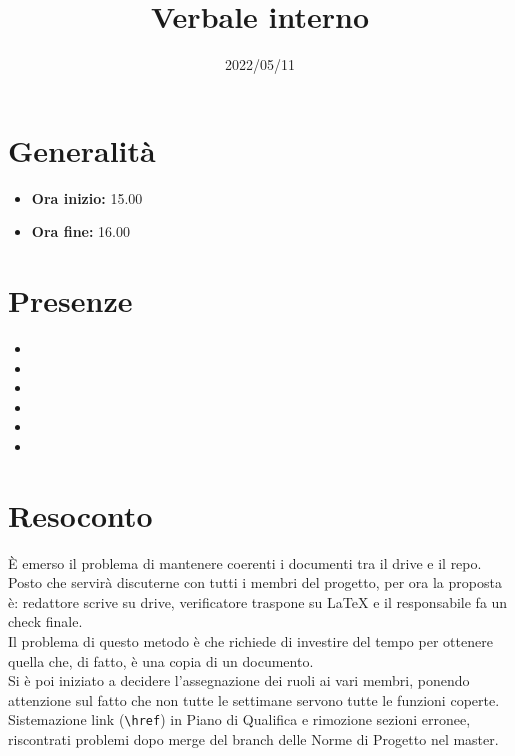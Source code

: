 \documentclass{classes/base}
\title{Verbale interno}
\date{2022/05/11}
\author{\marcob}
\renewcommand{\maketitle}{
    
}
\begin{document}
    \maketitle

    \section*{Generalità}
    \begin{itemize}
        \item \textbf{Ora inizio:} 15.00
        \item \textbf{Ora fine:} 16.00
    \end{itemize}

    \section*{Presenze}
    \begin{itemize}
     	\item \angela
      	\item \marcob
        \item \tommaso
        \item \ruth
        \item \matteo
        \item \giulio
    \end{itemize}

    \section*{Resoconto}
    È emerso il problema di mantenere coerenti i documenti tra il drive e il repo. Posto che servirà discuterne con tutti i membri del progetto, per ora la proposta è: redattore scrive su drive, verificatore traspone su LaTeX e il responsabile fa un check finale. \\
    Il problema di questo metodo è che richiede di investire del tempo per ottenere quella che, di fatto, è una copia di un documento.\\
    Si è poi iniziato a decidere l'assegnazione dei ruoli ai vari membri, ponendo attenzione sul fatto che non tutte le settimane servono tutte le funzioni coperte.\\
    Sistemazione link (\verb|\href|) in Piano di Qualifica e rimozione sezioni erronee, riscontrati problemi dopo merge del branch delle Norme di Progetto nel master.
\end{document}
